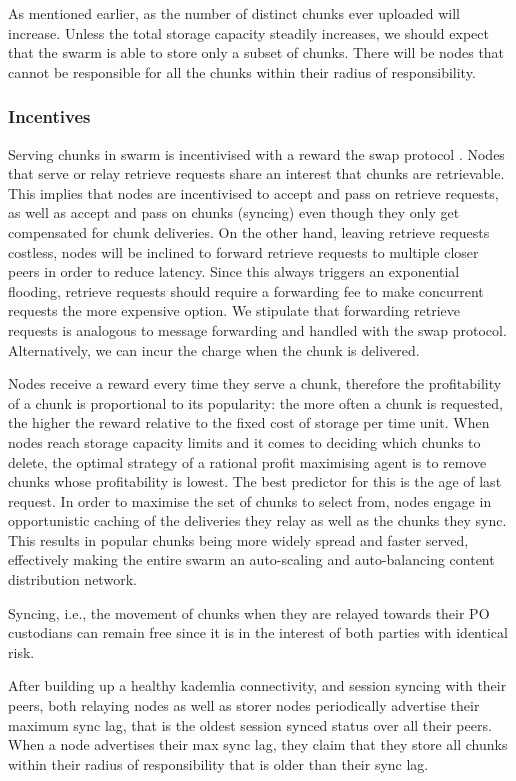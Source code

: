 As mentioned earlier, as the number of distinct chunks ever uploaded will increase. Unless the total storage capacity steadily increases, we should expect that the swarm is able to store only a subset of chunks. There will be nodes that cannot be responsible for all the chunks within their radius of responsibility. 


\subsubsection{Incentives}

Serving chunks in swarm is incentivised with a reward the swap protocol \cite{ethersphere2016sw3}. 
Nodes that serve or relay retrieve requests share an interest that chunks are retrievable. 
This implies that nodes are incentivised to accept and pass on retrieve requests, as well as accept and pass on chunks (syncing) even though they only get compensated for chunk deliveries. 
On the other hand, leaving retrieve requests costless, nodes will be inclined to forward retrieve requests to multiple closer peers in order to reduce latency. Since this always triggers an exponential flooding,  retrieve requests should require a forwarding fee to make concurrent requests the more expensive option. We stipulate that forwarding retrieve requests is analogous to message forwarding and handled with the swap protocol. Alternatively, we can incur the charge when the chunk is delivered.

Nodes receive a reward every time they serve a chunk, therefore the profitability of a chunk is proportional to its popularity: the more often a chunk is requested, the higher the reward relative to the fixed cost of storage per time unit.
When nodes reach storage capacity limits and it comes to deciding which chunks to delete, the optimal strategy of a rational profit maximising agent is to remove chunks whose profitability is lowest. The best predictor for this is the age of last request. In order to maximise the set of chunks to select from, nodes engage in opportunistic caching of the deliveries they relay as well as the chunks they sync. This results in popular chunks being more widely spread and faster served, effectively making the entire swarm an auto-scaling and auto-balancing content distribution network.

Syncing, i.e., the movement of chunks when they are relayed towards their PO custodians can remain free since it is in the interest of both parties with identical risk. 

After building up a healthy kademlia connectivity, and session syncing with their peers, both relaying nodes as well as storer nodes periodically advertise their maximum sync lag, that is the oldest session synced status over all their peers. When a node advertises their max sync lag, they claim that they store all chunks within their radius of responsibility that is older than their sync lag.

